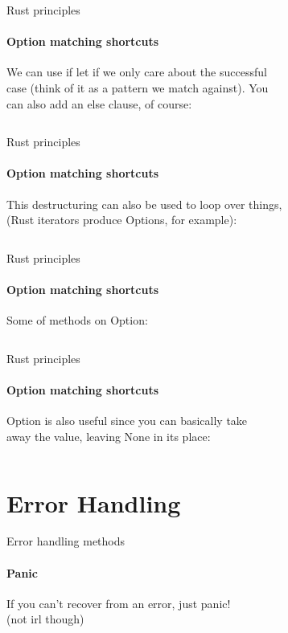 \documentclass[usenames,dvipsnames,10pt,aspectratio=169]{beamer}
\begin{document}
\begin{frame}{Rust principles}
\framesubtitle{Option matching shortcuts}
\large
We can use \textcolor{ucuyellow}{if let} if we only care about the successful\\
case (think of it as a pattern we match against). You\\
can also add an else clause, of course:

\vspace{0.3cm}
\inputminted[fontsize=\Large]{rust}{code/option4.rs}
\end{frame}

\begin{frame}{Rust principles}
\framesubtitle{Option matching shortcuts}
\large
This destructuring can also be used to loop over things,\\
(Rust iterators produce Options, for example):\\

\vspace{0.3cm}
\inputminted[fontsize=\Large]{rust}{code/option5.rs}
\end{frame}

\begin{frame}{Rust principles}
\framesubtitle{Option matching shortcuts}
\large
Some of methods on Option:
\vspace{0.5cm}
\inputminted[fontsize=\Large]{rust}{code/option6.rs}
\end{frame}

\begin{frame}{Rust principles}
\framesubtitle{Option matching shortcuts}
\large
Option is also useful since you can basically take\\
away the value, leaving None in its place:\\
\vspace{0.5cm}
\inputminted[fontsize=\Large]{rust}{code/option7.rs}
\end{frame}


\section{Error Handling}

\begin{frame}{Error handling methods}
	\framesubtitle{Panic}
\large
If you can't recover from an error, just \textcolor{ucuyellow}{panic!}\\
(not irl though)
\vspace{0.9cm}
\inputminted[fontsize=\Large]{rust}{code/error1.rs}
\normalsize
\end{frame}
\end{document}
